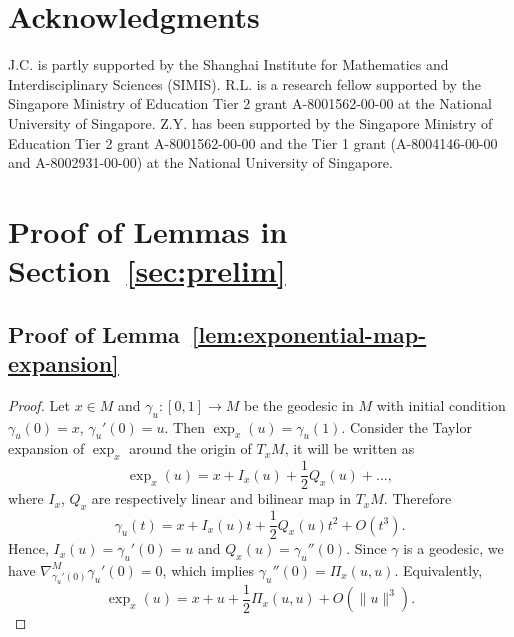 \documentclass[11pt]{article}
\theoremstyle{plain}
\theoremstyle{definition}
\begin{document}
\section*{Acknowledgments}J.C. is partly supported by the Shanghai Institute for Mathematics and Interdisciplinary Sciences (SIMIS). R.L. is a research fellow supported by the Singapore Ministry of Education Tier 2 grant A-8001562-00-00 at the National University of Singapore. Z.Y. has been supported by the Singapore Ministry of Education Tier 2 grant A-8001562-00-00 and the Tier 1 grant (A-8004146-00-00 and A-8002931-00-00) at the National University of Singapore.


\appendix

\section{Proof of Lemmas in Section~\ref{sec:prelim}}
\label{app:lemma-sec2}

\subsection{Proof of Lemma~\ref{lem:exponential-map-expansion}}\label{sec:pf-exponential-map-expansion}
\begin{proof}
     Let $x\in M$ and $\gamma_u\colon [0,1] \to M$ be the  geodesic in $M$ with initial condition $\gamma_u(0) = x$, $\gamma_u'(0) = u$. Then $\exp_{x}(u) = \gamma_u(1)$. Consider the Taylor expansion of $\exp_x$ around the origin of $T_xM$, it will be written as
    \[
    \exp_x(u) = x + I_x(u) + \frac{1}{2} Q_x(u) + \dots,
    \]
where $I_x$, $Q_x$ are respectively linear and bilinear map in $T_xM$. 
Therefore 
\[
\gamma_u(t) = x + I_x(u)t + \frac{1}{2} Q_x(u)t^2 +O(t^3). 
\]
Hence, $I_x(u) = \gamma_u'(0) = u$ and $ Q_x(u) = \gamma_u''(0)$. Since $\gamma$ is a geodesic, we have $\nabla^M_{\gamma_u'(0)} \gamma_u'(0) = 0$, which implies $\gamma_u''(0) = \Pi_x(u,u)$. Equivalently, 
\[
\exp_x(u) = x + u + \frac{1}{2}\Pi_x(u,u) + O(\|u\|^3).
\]
\end{proof}
\end{document}
